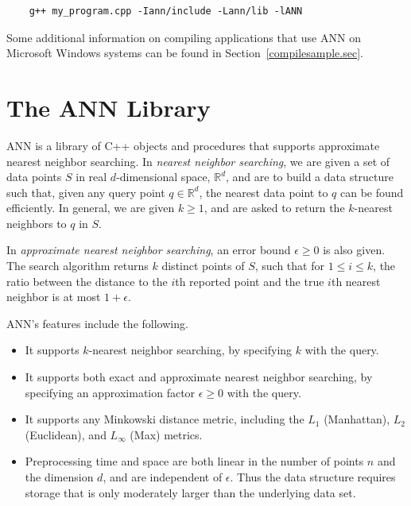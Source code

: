 \documentclass[11pt]{article}		%
\newcommand{\ANN}[0]{\textsf{ANN}}
\newcommand{\RE}{\mathbb{R}}			%
\begin{document}
{\small \begin{verbatim}
    g++ my_program.cpp -Iann/include -Lann/lib -lANN
\end{verbatim} }

Some additional information on compiling applications that use {\ANN} on
Microsoft Windows systems can be found in
Section~\ref{compilesample.sec}.

\newpage
\section{The {\ANN} Library}\label{annlib.sec}

{\ANN} is a library of C++ objects and procedures that supports
approximate nearest neighbor searching.  In \emph{nearest neighbor
searching}, we are given a set of data points $S$ in real
$d$-dimensional space, $\RE^d$, and are to build a data structure such
that, given any query point $q \in \RE^d$, the nearest data point to $q$
can be found efficiently.  In general, we are given $k \ge 1$, and are
asked to return the $k$-nearest neighbors to $q$ in $S$.

In \emph{approximate nearest neighbor searching}, an error bound
$\epsilon \ge 0$ is also given.  The search algorithm returns $k$
distinct points of $S$, such that for $1 \le i \le k$, the ratio between
the distance to the $i$th reported point and the true $i$th nearest
neighbor is at most $1+\epsilon$.

\ANN's features include the following.
\begin{itemize}
\item	It supports $k$-nearest neighbor searching, by specifying $k$
	with the query.
\item	It supports both exact and approximate nearest neighbor searching,
	by specifying an approximation factor $\epsilon \ge 0$ with
	the query.
\item	It supports any Minkowski distance metric, including the $L_1$
	(Manhattan), $L_2$ (Euclidean), and $L_{\infty}$ (Max) metrics.
\item	Preprocessing time and space are both linear in the number of
	points $n$ and the dimension $d$, and are independent of $\epsilon$.
	Thus the data structure requires storage that is only moderately
	larger than the underlying data set.
\end{itemize}
\end{document}
